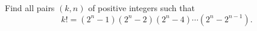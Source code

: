 Find all pairs $(k,n)$ of positive integers such that \[k!=(2^n-1)(2^n-2)(2^n-4)\cdots(2^n-2^{n-1}).\]